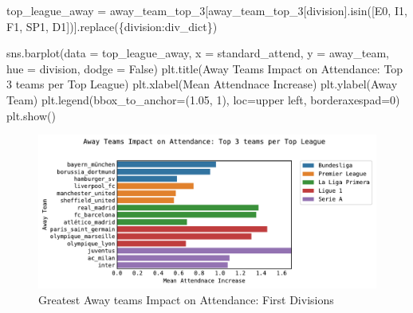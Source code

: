\documentclass[
  letterpaper,
  DIV=11,
  numbers=noendperiod]{scrartcl}
\newenvironment{Shaded}{\begin{snugshade}}{\end{snugshade}}
\newcommand{\DecValTok}[1]{\textcolor[rgb]{0.68,0.00,0.00}{#1}}
\newcommand{\FloatTok}[1]{\textcolor[rgb]{0.68,0.00,0.00}{#1}}
\newcommand{\NormalTok}[1]{\textcolor[rgb]{0.00,0.23,0.31}{#1}}
\newcommand{\OperatorTok}[1]{\textcolor[rgb]{0.37,0.37,0.37}{#1}}
\newcommand{\StringTok}[1]{\textcolor[rgb]{0.13,0.47,0.30}{#1}}
\newcommand{\VariableTok}[1]{\textcolor[rgb]{0.07,0.07,0.07}{#1}}
\begin{document}
\begin{Shaded}
\begin{Highlighting}[]
\NormalTok{top\_league\_away }\OperatorTok{=}\NormalTok{ away\_team\_top\_3[away\_team\_top\_3[}\StringTok{\textquotesingle{}division\textquotesingle{}}\NormalTok{].isin([}\StringTok{\textquotesingle{}E0\textquotesingle{}}\NormalTok{, }\StringTok{\textquotesingle{}I1\textquotesingle{}}\NormalTok{, }\StringTok{\textquotesingle{}F1\textquotesingle{}}\NormalTok{, }\StringTok{\textquotesingle{}SP1\textquotesingle{}}\NormalTok{, }\StringTok{\textquotesingle{}D1\textquotesingle{}}\NormalTok{])].replace(\{}\StringTok{\textquotesingle{}division\textquotesingle{}}\NormalTok{:div\_dict\})}

\NormalTok{sns.barplot(data }\OperatorTok{=}\NormalTok{ top\_league\_away, x }\OperatorTok{=} \StringTok{\textquotesingle{}standard\_attend\textquotesingle{}}\NormalTok{, y }\OperatorTok{=} \StringTok{\textquotesingle{}away\_team\textquotesingle{}}\NormalTok{, hue }\OperatorTok{=} \StringTok{\textquotesingle{}division\textquotesingle{}}\NormalTok{, dodge }\OperatorTok{=} \VariableTok{False}\NormalTok{)}
\NormalTok{plt.title(}\StringTok{\textquotesingle{}Away Teams Impact on Attendance: Top 3 teams per Top League\textquotesingle{}}\NormalTok{)}
\NormalTok{plt.xlabel(}\StringTok{\textquotesingle{}Mean Attendnace Increase\textquotesingle{}}\NormalTok{)}
\NormalTok{plt.ylabel(}\StringTok{\textquotesingle{}Away Team\textquotesingle{}}\NormalTok{)}
\NormalTok{plt.legend(bbox\_to\_anchor}\OperatorTok{=}\NormalTok{(}\FloatTok{1.05}\NormalTok{, }\DecValTok{1}\NormalTok{), loc}\OperatorTok{=}\StringTok{\textquotesingle{}upper left\textquotesingle{}}\NormalTok{, borderaxespad}\OperatorTok{=}\DecValTok{0}\NormalTok{)}
\NormalTok{plt.show()}
\end{Highlighting}
\end{Shaded}

\begin{figure}[H]

{\centering \includegraphics{Blog_post_files/figure-pdf/fig-top_away_league-output-1.pdf}

}

\caption{\label{fig-top_away_league}Greatest Away teams Impact on
Attendance: First Divisions}

\end{figure}
\end{document}

